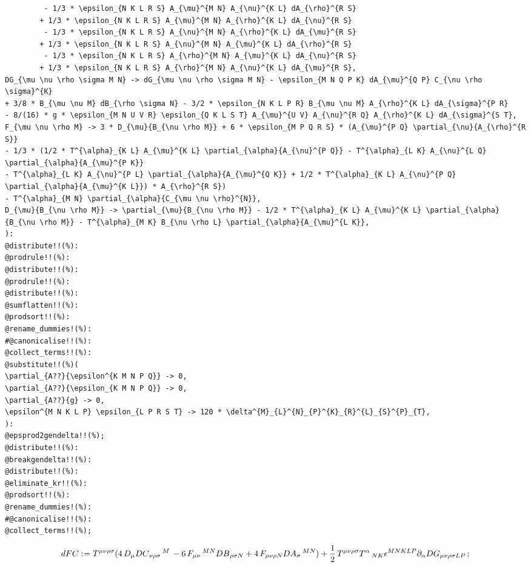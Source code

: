 \documentclass[11pt]{article}
\def\specialcolon{\mathrel{\mathop{:}}\hspace{-.5em}}
\begin{document}
{\begin{verbatim}
         - 1/3 * \epsilon_{N K L R S} A_{\mu}^{M N} A_{\nu}^{K L} dA_{\rho}^{R S}
        + 1/3 * \epsilon_{N K L R S} A_{\mu}^{M N} A_{\rho}^{K L} dA_{\nu}^{R S}
         - 1/3 * \epsilon_{N K L R S} A_{\nu}^{M N} A_{\rho}^{K L} dA_{\mu}^{R S}
        + 1/3 * \epsilon_{N K L R S} A_{\nu}^{M N} A_{\mu}^{K L} dA_{\rho}^{R S}
         - 1/3 * \epsilon_{N K L R S} A_{\rho}^{M N} A_{\mu}^{K L} dA_{\nu}^{R S}
        + 1/3 * \epsilon_{N K L R S} A_{\rho}^{M N} A_{\nu}^{K L} dA_{\mu}^{R S},
DG_{\mu \nu \rho \sigma M N} -> dG_{\mu \nu \rho \sigma M N} - \epsilon_{M N Q P K} dA_{\mu}^{Q P} C_{\nu \rho \sigma}^{K}
+ 3/8 * B_{\mu \nu M} dB_{\rho \sigma N} - 3/2 * \epsilon_{N K L P R} B_{\mu \nu M} A_{\rho}^{K L} dA_{\sigma}^{P R}
- 8/(16) * g * \epsilon_{M N U V R} \epsilon_{Q K L S T} A_{\mu}^{U V} A_{\nu}^{R Q} A_{\rho}^{K L} dA_{\sigma}^{S T},
F_{\mu \nu \rho M} -> 3 * D_{\mu}{B_{\nu \rho M}} + 6 * \epsilon_{M P Q R S} * (A_{\mu}^{P Q} \partial_{\nu}{A_{\rho}^{R S}} 
- 1/3 * (1/2 * T^{\alpha}_{K L} A_{\mu}^{K L} \partial_{\alpha}{A_{\nu}^{P Q}} - T^{\alpha}_{L K} A_{\nu}^{L Q} \partial_{\alpha}{A_{\mu}^{P K}}
- T^{\alpha}_{L K} A_{\nu}^{P L} \partial_{\alpha}{A_{\mu}^{Q K}} + 1/2 * T^{\alpha}_{K L} A_{\nu}^{P Q} \partial_{\alpha}{A_{\mu}^{K L}}) * A_{\rho}^{R S})
- T^{\alpha}_{M N} \partial_{\alpha}{C_{\mu \nu \rho}^{N}},
D_{\mu}{B_{\nu \rho M}} -> \partial_{\mu}{B_{\nu \rho M}} - 1/2 * T^{\alpha}_{K L} A_{\mu}^{K L} \partial_{\alpha}{B_{\nu \rho M}} - T^{\alpha}_{M K} B_{\nu \rho L} \partial_{\alpha}{A_{\mu}^{L K}},
):
@distribute!!(%):
@prodrule!!(%):
@distribute!!(%):
@prodrule!!(%):
@distribute!!(%):
@sumflatten!!(%):
@prodsort!!(%):
@rename_dummies!(%):
#@canonicalise!!(%):
@collect_terms!!(%):
@substitute!!(%)(
\partial_{A??}{\epsilon^{K M N P Q}} -> 0,
\partial_{A??}{\epsilon_{K M N P Q}} -> 0,
\partial_{A??}{g} -> 0,
\epsilon^{M N K L P} \epsilon_{L P R S T} -> 120 * \delta^{M}_{L}^{N}_{P}^{K}_{R}^{L}_{S}^{P}_{T},
):
@epsprod2gendelta!!(%);
@distribute!!(%):
@breakgendelta!!(%):
@distribute!!(%):
@eliminate_kr!!(%):
@prodsort!!(%):
@rename_dummies!(%):
#@canonicalise!!(%):
@collect_terms!!(%);
\end{verbatim}}
\begin{dmath*}[compact, spread=2pt]
dFC\specialcolon{}= {T}^{\mu \nu \rho \sigma} (4\, {D}_{\mu}{{DC}_{\nu \rho \sigma}\,^{M}}\,  - 6\, {F}_{\mu \nu}\,^{M N} {DB}_{\rho \sigma N} + 4\, {F}_{\mu \nu \rho N} {DA}_{\sigma}\,^{M N}) + \frac{1}{2}\, {T}^{\mu \nu \rho \sigma} {T}^{\alpha}\,_{N K} {\epsilon}^{M N K L P} {\partial}_{\alpha}{{DG}_{\mu \nu \rho \sigma L P}}\, ;
\end{dmath*}
\end{document}
